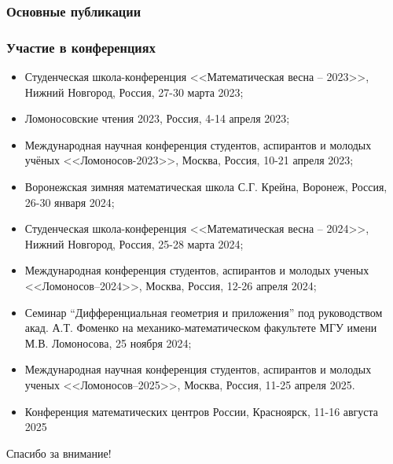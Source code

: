 \begin{frame} %
    \frametitle{Основные публикации}
     \nocite{nikulin2023spektr611484954}%
    \nocite{nikulin2024asymptotic617844539}%
    \nocite{vestnikLatest}%
    \nocite{sbornikLatest}%


\end{frame}

\begin{frame}[t,allowframebreaks]
    \frametitle{Участие в конференциях}
    \begin{itemize}%
\item Студенческая школа-конференция <<Математическая весна --  2023>>, Нижний Новгород, Россия, 27-30 марта 2023;
\item Ломоносовские чтения 2023, Россия, 4-14 апреля 2023;
\item {} Международная научная конференция студентов, аспирантов и молодых учёных <<Ломоносов-2023>>,  Москва, Россия, 10-21 апреля 2023;
\item Воронежская зимняя математическая школа С.Г. Крейна, Воронеж, Россия, 26-30 января 2024;
\item Студенческая школа-конференция <<Математическая весна -- 2024>>, Нижний Новгород, Россия, 25-28 марта 2024;
\item {} Международная конференция студентов, аспирантов и молодых ученых <<Ломоносов--2024>>, Москва, Россия, 12-26 апреля 2024;
\item Семинар “Дифференциальная геометрия и приложения” под руководством акад. А.Т. Фоменко на механико-математическом факультете МГУ имени М.В. Ломоносова, 25 ноября 2024;
\item {} Международная научная конференция студентов, аспирантов и молодых ученых <<Ломоносов--2025>>, Москва, Россия, 11-25 апреля 2025.
\item {} Конференция математических центров России, Красноярск, 11-16 августа 2025
\end{itemize}

\end{frame}

\begin{frame} %
    \begin{center}
        \Huge
        Спасибо за внимание!
    \end{center}
\end{frame}
